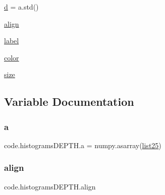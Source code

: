 \begin{DoxyCompactItemize}
\item 
\hyperlink{namespacecode_1_1histograms_d_e_p_t_h_a1114825fee103d2289be10a069bb725c}{d} = a.\+std()
\item 
\hyperlink{namespacecode_1_1histograms_d_e_p_t_h_a0494e7c29946819b9c00feb5c74d571b}{align}
\item 
\hyperlink{namespacecode_1_1histograms_d_e_p_t_h_a62ab8bf9c2118fd6f047252e7b36ddd4}{label}
\item 
\hyperlink{namespacecode_1_1histograms_d_e_p_t_h_a001b9e491c69e18b012fd3ced4bdb456}{color}
\item 
\hyperlink{namespacecode_1_1histograms_d_e_p_t_h_a6b8ca9383214f5806132565768f9c310}{size}
\end{DoxyCompactItemize}


\subsection{Variable Documentation}
\mbox{\label{namespacecode_1_1histograms_d_e_p_t_h_a53564e2242bbd6af5ab35d2f17862592}} 
\subsubsection{\texorpdfstring{a}{a}}
{\footnotesize\ttfamily code.\+histograms\+D\+E\+P\+T\+H.\+a = numpy.\+asarray(\hyperlink{namespacecode_1_1histograms_d_e_p_t_h_a077512d386e3da3f2d6a4205ce0e2cf9}{list25})}

\mbox{\label{namespacecode_1_1histograms_d_e_p_t_h_a0494e7c29946819b9c00feb5c74d571b}} 
\subsubsection{\texorpdfstring{align}{align}}
{\footnotesize\ttfamily code.\+histograms\+D\+E\+P\+T\+H.\+align}

\mbox{\label{namespacecode_1_1histograms_d_e_p_t_h_a9b2fa78bf8b2a2d6c4793c6f80bcc73c}} 
